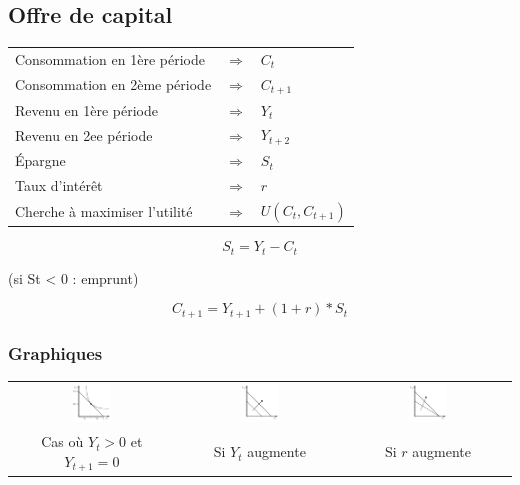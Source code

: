 \subsection{Offre de capital}



\begin{tabular}{lll}
	Consommation en 1ère période  & $\Rightarrow$ & $C_t$\\
	Consommation en 2ème période  & $\Rightarrow$ & $C_{t+1}$\\
	Revenu en 1ère période        & $\Rightarrow$ & $Y_t$\\
	Revenu en 2ee période         & $\Rightarrow$ & $Y_{t+2}$\\
	Épargne                       & $\Rightarrow$ & $S_t$\\
	Taux d'intérêt                & $\Rightarrow$ & $r$\\
	Cherche à maximiser l'utilité & $\Rightarrow$ & $U(C_t,C_{t+1})$
\end{tabular}
$$S_t = Y_t - C_t$$
\begin{flushright}
	(si St < 0 : emprunt)
\end{flushright}
$$C_{t+1} = Y_{t+1} + ( 1 + r ) * S_t $$



\subsubsection{Graphiques}



\begin{center}
	\begin{tabular}{ccc}
		\includegraphics[width=0.25\textwidth]{images/graph_offre_de_capital_ytplus1_nulle.pdf} & \includegraphics[width=0.25\textwidth]{images/graph_offre_de_capital_ytplus1_nulle_yt_augmente.pdf} & \includegraphics[width=0.25\textwidth]{images/graph_offre_de_capital_ytplus1_nulle_r_augmente.pdf}\\
		Cas où $Y_t>0$ et $Y_{t+1}=0$             &             Si $Y_t$ augmente             &             Si $r$ augmente
	\end{tabular}
\end{center}